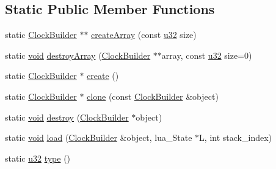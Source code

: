 \subsection*{Static Public Member Functions}
\begin{DoxyCompactItemize}
\item 
static \mbox{\hyperlink{classnjli_1_1_clock_builder}{Clock\+Builder}} $\ast$$\ast$ \mbox{\hyperlink{classnjli_1_1_clock_builder_aae2ec15a97eb44ff4ff88deb9044a62c}{create\+Array}} (const \mbox{\hyperlink{_util_8h_a10e94b422ef0c20dcdec20d31a1f5049}{u32}} size)
\item 
static \mbox{\hyperlink{_thread_8h_af1e856da2e658414cb2456cb6f7ebc66}{void}} \mbox{\hyperlink{classnjli_1_1_clock_builder_a85dfefe52cf31c7511ba96f128f34131}{destroy\+Array}} (\mbox{\hyperlink{classnjli_1_1_clock_builder}{Clock\+Builder}} $\ast$$\ast$array, const \mbox{\hyperlink{_util_8h_a10e94b422ef0c20dcdec20d31a1f5049}{u32}} size=0)
\item 
static \mbox{\hyperlink{classnjli_1_1_clock_builder}{Clock\+Builder}} $\ast$ \mbox{\hyperlink{classnjli_1_1_clock_builder_aab639feccc6592061e99bd343a93a92e}{create}} ()
\item 
static \mbox{\hyperlink{classnjli_1_1_clock_builder}{Clock\+Builder}} $\ast$ \mbox{\hyperlink{classnjli_1_1_clock_builder_a7c84e707ce704ab2d0c30bdba37d00c8}{clone}} (const \mbox{\hyperlink{classnjli_1_1_clock_builder}{Clock\+Builder}} \&object)
\item 
static \mbox{\hyperlink{_thread_8h_af1e856da2e658414cb2456cb6f7ebc66}{void}} \mbox{\hyperlink{classnjli_1_1_clock_builder_a8120396fc0e83b5df09572393e3cd88f}{destroy}} (\mbox{\hyperlink{classnjli_1_1_clock_builder}{Clock\+Builder}} $\ast$object)
\item 
static \mbox{\hyperlink{_thread_8h_af1e856da2e658414cb2456cb6f7ebc66}{void}} \mbox{\hyperlink{classnjli_1_1_clock_builder_ab48500de3517ff7b5d5afb6a893f1cad}{load}} (\mbox{\hyperlink{classnjli_1_1_clock_builder}{Clock\+Builder}} \&object, lua\+\_\+\+State $\ast$L, int stack\+\_\+index)
\item 
static \mbox{\hyperlink{_util_8h_a10e94b422ef0c20dcdec20d31a1f5049}{u32}} \mbox{\hyperlink{classnjli_1_1_clock_builder_ad418d0f1b84855aed3143d007eaceaa6}{type}} ()
\end{DoxyCompactItemize}
